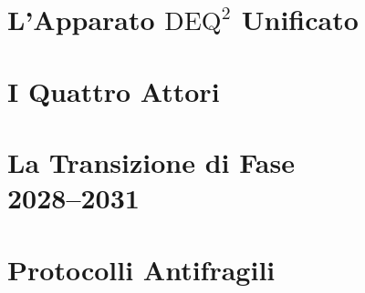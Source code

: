 \documentclass[12pt, twoside]{book}
\theoremstyle{plain}
\theoremstyle{definition}
\theoremstyle{remark}
\newcommand{\deq}{\mathrm{DEQ}^2}
\begin{document}
\part{L'Apparato \texorpdfstring{$\deq$}{DEQ²} Unificato}




\part{I Quattro Attori}






\part[La Transizione di Fase 2028--2031]{La Transizione di Fase\\2028--2031}




\part{Protocolli Antifragili}




\appendix





\end{document}
